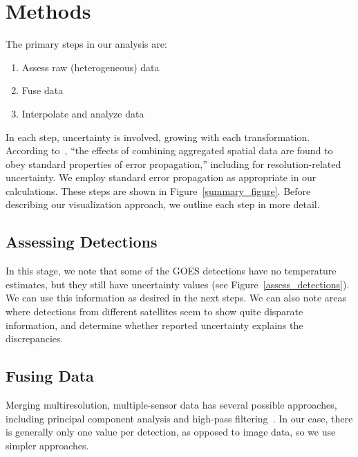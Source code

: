 \section{Methods}
\label{methods_section}
The primary steps in our analysis are:
\begin{enumerate}
\item{Assess raw (heterogeneous) data}
\item{Fuse data}
\item{Interpolate and analyze data}
\end{enumerate}

\noindent In each step, uncertainty is involved, growing with each transformation. According to~\cite{Pogson2015}, ``the effects of combining aggregated spatial data are found to obey standard properties of error propagation,'' including for resolution-related uncertainty. We employ standard error propagation as appropriate in our calculations. These steps are shown in Figure~\ref{summary_figure}. Before describing our visualization approach, we outline each step in more detail.

\subsection{Assessing Detections}
In this stage, we note that some of the GOES detections have no temperature estimates, but they still have uncertainty values (see Figure~\ref{assess_detections}). We can use this information as desired in the next steps. We can also note areas where detections from different satellites seem to show quite disparate information, and determine whether reported uncertainty explains the discrepancies.  

\subsection{Fusing Data}
Merging multiresolution, multiple-sensor data has several possible approaches, including principal component analysis and high-pass filtering~\cite{Chavez1990}. In our case, there is generally only one value per detection, as opposed to image data, so we use simpler approaches.

